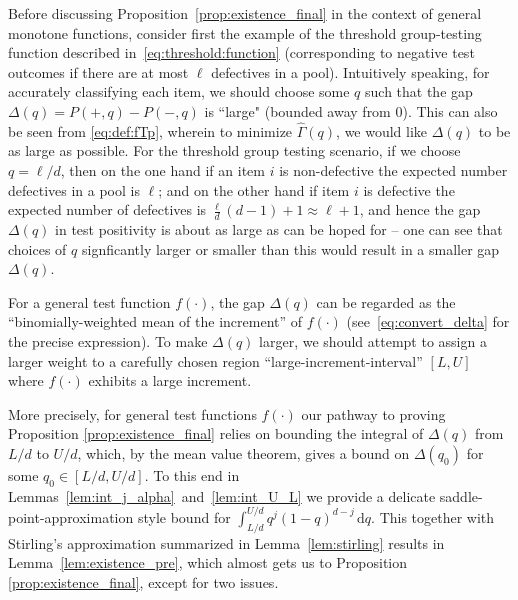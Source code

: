 \documentclass[onecolumn,letterpaper]{IEEEtran}
\newcommand{\ts}{{\ell}}
\newcommand{\cp}{{q}}
\newcommand{\pn}{{P(-,\cp)}}
\newcommand{\pp}{{P(+,\cp)}}
\newcommand{\pgap}{{\Delta(\cp)}}
\newcommand{\up}{{U}}
\newcommand{\lw}{{L}}
\newcommand*{\dif}{{\,\mathrm{d}}}
\newcommand{\ftaup}{{\hat{\Gamma}}}
\newcommand{\fTp}{\ftaup (\cp)}
\newcommand{\cpns}{\cp_0}
\newcommand{\pgapns}{{\Delta(\cpns)}}
\begin{document}
Before discussing Proposition~\ref{prop:existence_final} in the context of general monotone functions, consider first the example of the threshold group-testing function described in~\eqref{eq:threshold:function} (corresponding to negative test outcomes if there are at most $\ts$ defectives in a pool).
Intuitively speaking, for accurately classifying each item, we should choose some $q$ such that the gap $\pgap =\pp- \pn$ is ``large" (bounded away from $0$). This can also be seen from \eqref{eq:def:fTp}, wherein to minimize $\fTp$, we would like $\pgap$ to be as large as possible. 
For the threshold group testing scenario, 
if we choose $\cp=\ts/d$, then on the one hand if an item $i$ is non-defective the expected number defectives in a pool is $\ts$; and on the other hand if item $i$ is defective the expected number of  defectives is $ \frac{\ts}{d} (d-1) + 1 \approx \ts+1$, and hence the gap $\pgap$ in test positivity is about as large as can be hoped for -- one can see that choices of $q$ signficantly larger or smaller than this would result in a smaller gap $\pgap$. 

For a general test function $f(\cdot)$, the gap $\pgap$ can be regarded as the ``binomially-weighted mean of the increment'' of $f(\cdot)$ (see~\eqref{eq:convert_delta} for the precise expression). To make $\pgap$ larger, we should attempt to assign a larger weight to a carefully chosen region ``large-increment-interval'' $[\lw,\up]$ where $f(\cdot)$ exhibits a large increment. 

More precisely, for general test functions $f(\cdot)$ our pathway to proving  Proposition \ref{prop:existence_final} relies on bounding the integral of $\pgap$ from $\lw/d$ to $ \up/d$, which, by the mean value theorem, gives a bound on $\pgapns$ for some $\cpns\in [\lw/d,\up/d]$. To this end in Lemmas~\ref{lem:int_j_alpha}~and~\ref{lem:int_U_L} we provide a delicate saddle-point-approximation style bound for $\int_{\lw/d}^{\up/d} \cp^j (1-\cp)^{d-j} \dif \cp$. This together with Stirling's approximation summarized in Lemma~\ref{lem:stirling} results in Lemma~\ref{lem:existence_pre}, which almost gets us to Proposition \ref{prop:existence_final}, except for two issues.
\end{document}
